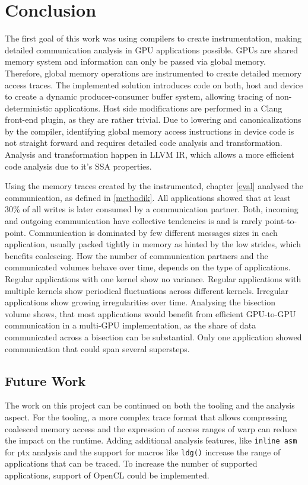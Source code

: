 \chapter{Conclusion}
The first goal of this work was using compilers to create  instrumentation, making detailed communication analysis in
GPU applications possible. GPUs are shared memory system and information can only be passed via global memory. Therefore, global memory operations are instrumented to create detailed memory access traces. The implemented solution introduces code on both, host and device to create a dynamic producer-consumer buffer system, allowing tracing of non-deterministic applications. Host side modifications are performed in a Clang front-end plugin, as they are rather trivial.
Due to lowering and canonicalizations by the compiler, identifying global memory access instructions in device code is not straight forward and requires detailed code analysis and transformation. Analysis and transformation happen in 
LLVM IR, which allows a more efficient code analysis due to it's SSA properties.

Using the memory traces created by the instrumented, chapter \ref{eval} analysed the communication, as defined in \ref{methodik}. All applications showed that at least 30\% of all writes is later consumed by a communication partner. Both, incoming and outgoing communication have collective tendencies is and is rarely point-to-point. Communication is dominated by few different messages sizes in each application, usually packed tightly in memory as hinted by the low strides, which benefits coalescing. How the number
of communication partners and the communicated volumes behave over time, depends on the type of applications. Regular applications with one kernel show no variance. Regular applications with multiple kernels show periodical fluctuations across different kernels. Irregular applications show growing irregularities over time. Analysing the bisection volume shows, that most applications would benefit from efficient GPU-to-GPU communication in a multi-GPU implementation, as the share of data communicated across 
a bisection can be substantial. Only one application showed communication that could span several supersteps.

\section{Future Work}
The work on this project can be continued on both the tooling and the analysis aspect. For the tooling, a more complex trace
format that allows compressing coalesced memory access and the expression of access ranges of warp can reduce the impact on 
the runtime. Adding additional analysis features, like \verb|inline asm| for ptx analysis and the support for macros 
like \verb|ldg()| increase the range of applications that can be traced. To increase the number of supported applications, support of OpenCL could be implemented.

